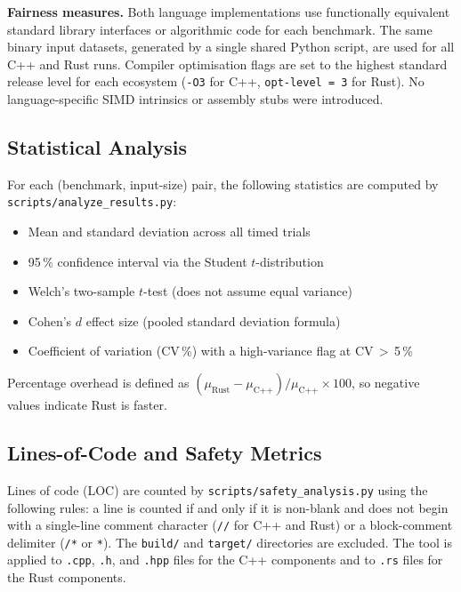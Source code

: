 \documentclass{article}
\begin{document}
\textbf{Fairness measures.}
Both language implementations use functionally equivalent standard library
interfaces or algorithmic code for each benchmark.
The same binary input datasets, generated by a single shared Python script,
are used for all C++ and Rust runs.
Compiler optimisation flags are set to the highest standard release level
for each ecosystem (\texttt{-O3} for C++, \texttt{opt-level = 3}
for Rust).
No language-specific SIMD intrinsics or assembly stubs were introduced.

\subsection{Statistical Analysis}

For each (benchmark, input-size) pair, the following statistics are computed
by \texttt{scripts/analyze\_results.py}:

\begin{itemize}[noitemsep]
  \item Mean and standard deviation across all timed trials
  \item 95\,\% confidence interval via the Student $t$-distribution
  \item Welch's two-sample $t$-test (does not assume equal variance)
  \item Cohen's $d$ effect size (pooled standard deviation formula)
  \item Coefficient of variation (CV\,\%) with a high-variance flag at
    CV\,$>$\,5\,\%
\end{itemize}

Percentage overhead is defined as
$(\mu_\text{Rust} - \mu_\text{C++})/\mu_\text{C++} \times 100$,
so negative values indicate Rust is faster.

\subsection{Lines-of-Code and Safety Metrics}

Lines of code (LOC) are counted by \texttt{scripts/safety\_analysis.py}
using the following rules: a line is counted if and only if it is
non-blank and does not begin with a single-line comment character
(\texttt{//} for C++ and Rust) or a block-comment delimiter
(\texttt{/*} or \texttt{*}).
The \texttt{build/} and \texttt{target/} directories are excluded.
The tool is applied to \texttt{.cpp}, \texttt{.h}, and \texttt{.hpp}
files for the C++ components and to \texttt{.rs} files for the Rust
components.
\end{document}
